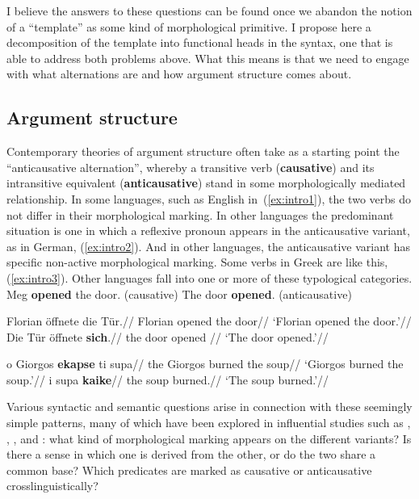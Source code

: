 I believe the answers to these questions can be found once we abandon the notion of a ``template'' as some kind of morphological primitive. I propose here a decomposition of the template into functional heads in the syntax, one that is able to address both problems above. What this means is that we need to engage with what alternations are and how argument structure comes about.

	\subsection{Argument structure}
Contemporary theories of argument structure often take as a starting point the ``anticausative alternation'', whereby a transitive verb (\textbf{causative}) and its intransitive equivalent (\textbf{anticausative}) stand in some morphologically mediated relationship. In some languages, such as English in~(\ref{ex:intro1}), the two verbs do not differ in their morphological marking. In other languages the predominant situation is one in which a reflexive pronoun appears in the anticausative variant, as in German, (\ref{ex:intro2}). And in other languages, the anticausative variant has specific non-active morphological marking. Some verbs in Greek are like this, (\ref{ex:intro3}). Other languages fall into one or more of these typological categories.
\pex\label{ex:intro1}
	\a Meg \textbf{opened }the door. \hfill (causative)
 	\a The door \textbf{opened}.			\hfill (anticausative)
\xe

\pex\label{ex:intro2}
	\a \begingl
		\gla{}Florian \"offnete die T\"ur.//
		\glb Florian opened the door//
		\glft `Florian opened the door.'//
	\endgl
	\a \begingl
		\gla{}Die T\"ur \"offnete \textbf{sich}.//
		\glb the door opened //
		\glft `The door opened.'//
	\endgl
\xe	

\pex\label{ex:intro3}
	\a \begingl
		\gla{}o Giorgos \textbf{ekapse} ti supa//
		\glb the Giorgos burned the soup//
		\glft `Giorgos burned the soup.'//
	\endgl
	\a \begingl
		\gla{}i supa \textbf{kaike}//
		\glb the soup burned.//
		\glft `The soup burned.'//
	\endgl
\xe

Various syntactic and semantic questions arise in connection with these seemingly simple patterns, many of which have been explored in influential studies such as \cite{haspelmath93}, \cite{unaccusativity95}, \cite{schaefer08}, \cite{koontzgarboden09} and \cite{layering15}: what kind of morphological marking appears on the different variants? Is there a sense in which one is derived from the other, or do the two share a common base? Which predicates are marked as causative or anticausative crosslinguistically? 

